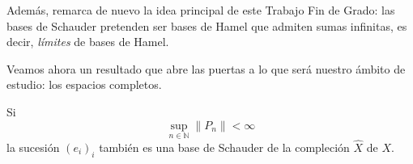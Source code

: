 	Además, remarca de nuevo la idea principal de este Trabajo Fin de Grado: las bases de Schauder pretenden ser bases de Hamel que admiten sumas infinitas, es decir, \emph{límites} de bases de Hamel.
	
	Veamos ahora un resultado que abre las puertas a lo que será nuestro ámbito de estudio: los espacios completos.
	
	\begin{proposition}\label{P:1.4}	
		Si
		\begin{equation}\label{eq:acotacion}
			\sup_{n\in\mathbb{N}}\|P_n\|<\infty
		\end{equation}
		la sucesión $(e_i)_i$ también es una base de Schauder de la compleción $\hat{X}$ de $X$.
	\end{proposition}
	

